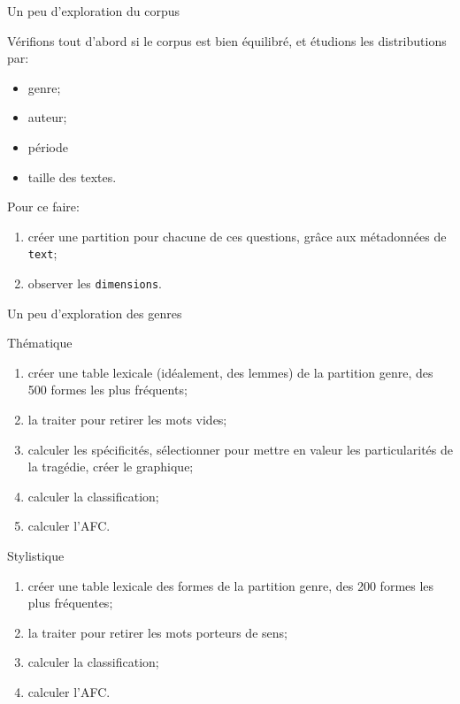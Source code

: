 \documentclass{beamer}
\begin{document}
\begin{frame}{Un peu d'exploration du corpus}
	
	Vérifions tout d'abord si le corpus est bien équilibré, et étudions les distributions par:
	\begin{itemize}
		\item genre;
		\item auteur;
		\item période
		\item taille des textes.
	\end{itemize}

Pour ce faire:
\begin{enumerate}
	\item créer une partition pour chacune de ces questions, grâce aux métadonnées de \texttt{text};
	\item observer les \texttt{dimensions}.
\end{enumerate}
	
\end{frame}



\begin{frame}{Un peu d'exploration des genres}
	
	\begin{block}{Thématique}
		
		\begin{enumerate}
			\item créer une table lexicale (idéalement, des lemmes) de la partition genre, des 500 formes les plus fréquents;
			\item la traiter pour retirer les mots vides;
			\item calculer les spécificités, sélectionner pour mettre en valeur les particularités de la tragédie, créer le graphique;
			\item calculer la classification;
			\item calculer l'AFC.
		\end{enumerate}
	\end{block}

\begin{block}{Stylistique}
	
	\begin{enumerate}
		\item créer une table lexicale des formes de la partition genre, des 200 formes les plus fréquentes;
		\item la traiter pour retirer les mots porteurs de sens;
		\item calculer la classification;
		\item calculer l'AFC.
	\end{enumerate}
\end{block}
	
\end{frame}
\end{document}
